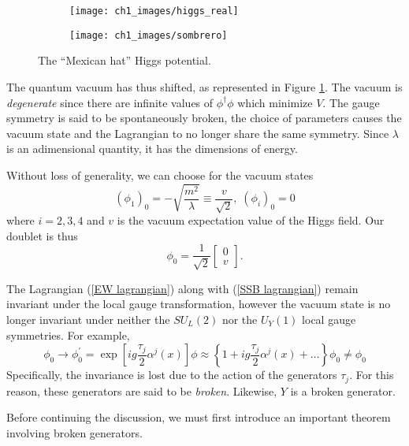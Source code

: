 \documentclass[10pt,a4paper]{book}
\begin{document}
\begin{figure}
\begin{subfigure}{.5\textwidth}
\centering
\texttt{[image: ch1\_images/higgs\_real]}
\end{subfigure}
\begin{subfigure}{.5\textwidth}
\centering
\texttt{[image: ch1\_images/sombrero]}
\end{subfigure}
\caption{The ``Mexican hat'' Higgs potential.}
\label{Higgs Potential}
\end{figure}
The quantum vacuum has thus shifted, as represented in Figure \ref{Higgs Potential}. The vacuum is \emph{degenerate} since there are infinite values of $\phi^\dagger\phi$ which minimize $V$. The gauge symmetry is said to be spontaneously broken, the choice of parameters causes the vacuum state and the Lagrangian to no longer share the same symmetry. Since $\lambda$ is an adimensional quantity, it has the dimensions of energy.

Without loss of generality, we can choose for the vacuum states
\begin{equation}
(\phi_1)_0 = -\sqrt{\frac{m^2}{\lambda}} \equiv \frac{v}{\sqrt{2}}, \; (\phi_i)_0 = 0
\end{equation}
where $i = 2,3,4$ and $v$ is the vacuum expectation value of the Higgs field.
Our doublet is thus
\begin{equation}
\phi_0 = \frac{1}{\sqrt{2}}\begin{bmatrix}
0 \\
v
\end{bmatrix}.
\end{equation}

The Lagrangian (\ref{EW lagrangian}) along with (\ref{SSB lagrangian}) remain invariant under the local gauge transformation, however the vacuum state is no longer invariant under neither the $SU_L(2)$ nor the $U_Y(1)$ local gauge symmetries. For example, 
\begin{equation}
\phi_0 \rightarrow \phi_0^\prime = \exp\left[ig \frac{\tau_j}{2}\alpha^j(x)\right]\phi \approx \left\lbrace 1  + ig\frac{\tau_j}{2}\alpha^j(x) + \dots \right\rbrace\phi_0 \neq \phi_0
\end{equation}
Specifically, the invariance is lost due to the action of the generators $\tau_j$. For this reason, these generators are said to be \emph{broken}. Likewise, $Y$ is a broken generator.

Before continuing the discussion, we must first introduce an important theorem involving broken generators.
\end{document}
